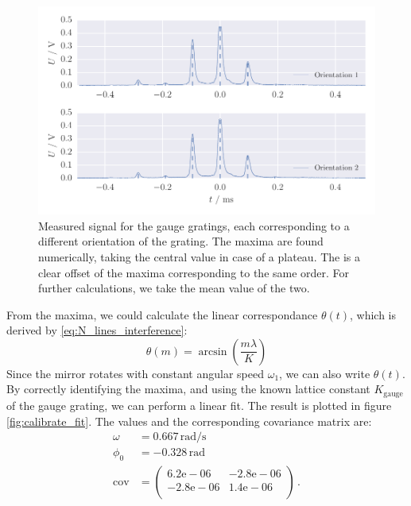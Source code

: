 \begin{figure}[htpb]
    \centering
    \includegraphics[width=1.0\linewidth]{figures/calibrate_peaks}
    \caption{
        Measured signal for the gauge gratings, each corresponding to a different orientation of the 
        grating. The maxima are found numerically, taking the central value in case of a plateau. 
        The is a clear offset of the maxima corresponding to the same order. For further calculations, 
        we take the mean value of the two. 
        }
     \label{fig:calibrate_peaks}
\end{figure}

From the maxima, we could calculate the linear correspondance $\theta(t)$, 
which is derived by \ref{eq:N_lines_interference}:
\begin{equation}
    \theta(m) = \arcsin\left(\frac{m \lambda}{K}\right)
\end{equation}
Since the mirror rotates with constant angular speed $\omega_1$, we can 
also write $\theta(t)$. By correctly identifying the maxima, and using the 
known lattice constant $K_\mathrm{gauge}$ of the gauge grating, we can perform a linear fit.
The result is plotted in figure \ref{fig:calibrate_fit}. The values and the corresponding 
covariance matrix are: 
\begin{align}
    \omega &= 0.667 \, \mathrm{rad / s}\\
    \phi_0 &= -0.328 \, \mathrm{rad}\\
	\mathrm{cov} &=
	\begin{pmatrix}
		6.2\mathrm{e}-06 &-2.8\mathrm{e}-06 \\
		-2.8\mathrm{e}-06 &1.4\mathrm{e}-06 \\
	\end{pmatrix}  \, .
\end{align}

